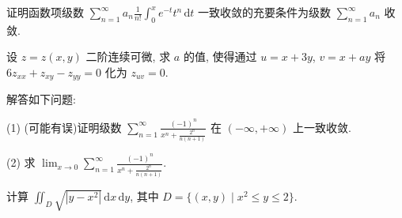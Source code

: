 证明函数项级数 $\sum_{n=1}^{\infty} a_n \frac{1}{n!} \int_0^x e^{-t} t^n \, \mathrm{d}t$ 一致收敛的充要条件为级数 $\sum_{n=1}^{\infty} a_n$ 收敛.\par
设 $z = z(x, y)$ 二阶连续可微, 求 $a$ 的值, 使得通过 $u = x + 3y$, $v = x + ay$ 将 $6z_{xx} + z_{xy} - z_{yy} = 0$ 化为 $z_{uv} = 0$.\par
解答如下问题:\par
(1) (可能有误)证明级数 $\sum_{n=1}^{\infty} \frac{(-1)^n}{x^n + \frac{2^n}{n(n+1)}}$ 在 $(- \infty, +\infty)$ 上一致收敛.\par
(2) 求 $\lim_{x\to 0}\sum_{n = 1}^{\infty}\frac{(-1)^n}{x^n + \frac{2^n}{n(n + 1)}}.$\par
计算 $\iint_{D} \sqrt{|y - x^2|} \, \mathrm{d}x \, \mathrm{d}y$, 其中 $D = \{(x, y) \mid x^2 \leq y \leq 2\}$.\par
